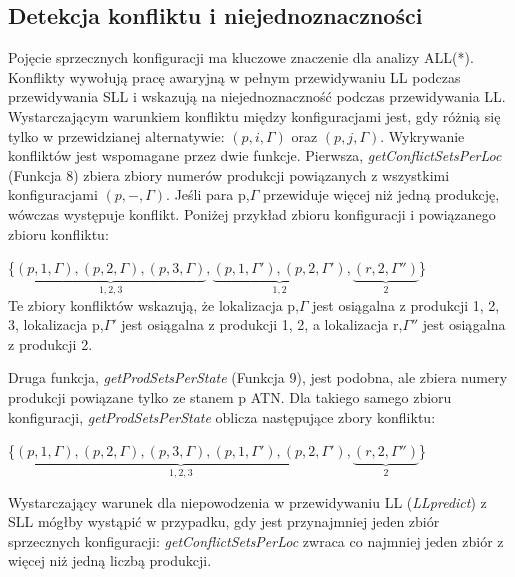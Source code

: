 \subsection{Detekcja konfliktu i niejednoznaczności}
Pojęcie sprzecznych konfiguracji ma kluczowe znaczenie dla analizy ALL(*).
Konflikty wywołują pracę awaryjną w pełnym przewidywaniu LL podczas przewidywania
SLL i wskazują na niejednoznaczność podczas przewidywania LL.
Wystarczającym warunkiem konfliktu między konfiguracjami jest, gdy różnią się
tylko w przewidzianej alternatywie: $(p, i, \Gamma)$ oraz $(p, j, \Gamma)$.
Wykrywanie konfliktów jest wspomagane przez dwie funkcje.
Pierwsza, \textit{getConflictSetsPerLoc} (Funkcja 8) zbiera zbiory numerów produkcji powiązanych
z wszystkimi konfiguracjami $(p, -, \Gamma)$.
Jeśli para p,$\Gamma$ przewiduje więcej niż jedną produkcję, wówczas występuje konflikt.
Poniżej przykład zbioru konfiguracji i powiązanego zbioru konfliktu:
\par
\{$\underbrace{(p,1,\Gamma),(p,2,\Gamma),(p,3,\Gamma)}_{1,2,3},
\underbrace{(p,1,\Gamma'),(p,2,\Gamma')}_{1,2},\underbrace{(r,2,\Gamma'')}_{2}$\}
\\
Te zbiory konfliktów wskazują, że lokalizacja p,$\Gamma$ jest osiągalna z produkcji {1, 2, 3},
lokalizacja p,$\Gamma'$ jest osiągalna z produkcji {1, 2},
a lokalizacja r,$\Gamma''$ jest osiągalna z produkcji {2}.
\\
\par
Druga funkcja, \textit{getProdSetsPerState} (Funkcja 9), jest podobna, ale zbiera numery
produkcji powiązane tylko ze stanem p ATN.
Dla takiego samego zbioru konfiguracji, \textit{getProdSetsPerState} oblicza następujące zbory konfliktu:
\par
\{$\underbrace{(p,1,\Gamma),(p,2,\Gamma),(p,3,\Gamma),(p,1,\Gamma'),(p,2,\Gamma')}_{1,2,3},
\underbrace{(r,2,\Gamma'')}_{2}$\}
\par
Wystarczający warunek dla niepowodzenia w przewidywaniu LL (\textit{LLpredict})
z SLL mógłby wystąpić w przypadku, gdy jest przynajmniej jeden zbiór sprzecznych konfiguracji:
\textit{getConflictSetsPerLoc} zwraca co najmniej jeden zbiór z więcej niż jedną liczbą produkcji.
